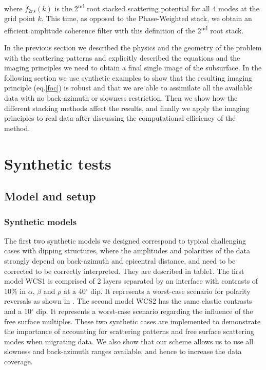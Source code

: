 \documentclass[10pt,a4paper]{article}
\numberwithin{equation}{section}
\DeclareRobustCommand{\rq}[1]{{\sethlcolor{myblue}\hl{#1}}}
\begin{document}
\noindent where $f_{2rs}(k)$ is the 2\textsuperscript{nd} root stacked scattering potential for all 4 modes at the grid point $k$.
This time, as opposed to the Phase-Weighted stack, we obtain an efficient amplitude coherence filter with this definition of the 2\textsuperscript{nd} root stack.

In the previous section we described the physics and the geometry of the problem with the scattering patterns and explicitly described the equations and the imaging principles we need to obtain a final single image of the subsurface.
In the following section we use synthetic examples to show that the resulting imaging principle (eq.\eqref{foc}) is robust and that we are able to assimilate all the available data with no back-azimuth or slowness restriction.
Then we show how the different stacking methods affect the results, and finally we apply the imaging principles to real data after discussing the computational efficiency of the method. 


\section{Synthetic tests}

\subsection{Model and setup}

\subsubsection{Synthetic models}

The first two synthetic models we designed correspond to typical challenging cases with dipping structures, where the amplitudes and polarities of the data strongly depend on back-azimuth and epicentral distance, and need to be corrected to be correctly interpreted.
They are described in table1.
The first model WCS1 is comprised of 2 layers separated by an interface with contrasts of 10$\%$ in $\alpha$, $\beta$ and $\rho$ at a 40$^{\circ}$ dip.
It represents a worst-case scenario for polarity reversals as shown in \cite{cheng_gji_16}.
The second model WCS2 has the same elastic contrasts and a 10$^{\circ}$ dip.
It represents a worst-case scenario regarding the influence of the free surface multiples.
These two synthetic cases are implemented to demonstrate the importance of accounting for scattering patterns and free surface scattering modes when migrating data.
We also show that our scheme allows us to use all slowness and back-azimuth ranges available, and hence to increase the data coverage.
\end{document}
